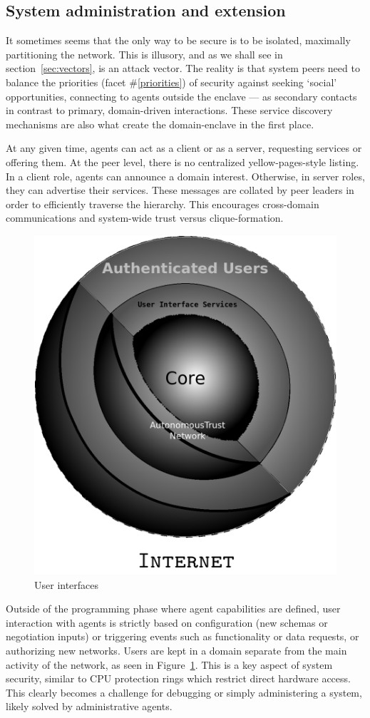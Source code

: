 \begin{ppl}

\end{ppl}


\subsection{System administration and extension}\label{subsec:admin}

It sometimes seems that the only way to be secure is to be isolated, maximally partitioning the network.
This is illusory, and as we shall see in section~\ref{sec:vectors}, is an attack vector.
The reality is that system peers need to balance the priorities (facet \#\ref{priorities}) of security against seeking `social' opportunities, connecting to agents outside the enclave --- as secondary contacts in contrast to primary, domain-driven interactions.
These service discovery mechanisms are also what create the domain-enclave in the first place.

At any given time, agents can act as a client or as a server, requesting services or offering them.
At the peer level, there is no centralized yellow-pages-style listing.
In a client role, agents can announce a domain interest.
Otherwise, in server roles, they can advertise their services.
These messages are collated by peer leaders in order to efficiently traverse the hierarchy.
This encourages cross-domain communications and system-wide trust versus clique-formation.

\begin{figure}
	\centering
	\includegraphics[width=0.4\linewidth]{users}
	\caption{User interfaces}
	\label{fig:users}
\end{figure}

Outside of the programming phase where agent capabilities are defined, user interaction with agents is strictly based on configuration (new schemas or negotiation inputs) or triggering events such as functionality or data requests, or authorizing new networks.
Users are kept in a domain separate from the main activity of the network, as seen in Figure~\ref{fig:users}.
This is a key aspect of system security, similar to CPU protection rings which restrict direct hardware access.
This clearly becomes a challenge for debugging or simply administering a system, likely solved by administrative agents.

\begin{ppl}

\end{ppl}